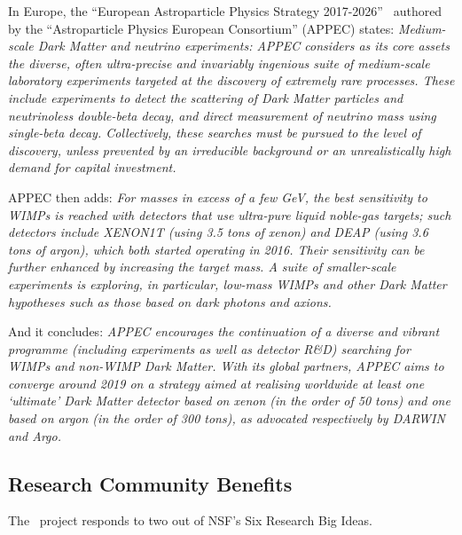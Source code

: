 In Europe, the ``European Astroparticle Physics Strategy 2017-2026''~\cite{AstroparticlePhysicsEuropeanConsortium:2017wy} authored by the ``Astroparticle Physics European Consortium'' (APPEC) states: {\it Medium-scale Dark Matter and neutrino experiments: APPEC considers as its core assets the diverse, often ultra-precise and invariably ingenious suite of medium-scale laboratory experiments targeted at the discovery of extremely rare processes.  These include experiments to detect the scattering of Dark Matter particles and neutrinoless double-beta decay, and direct measurement of neutrino mass using single-beta decay.  Collectively, these searches must be pursued to the level of discovery, unless prevented by an irreducible background or an unrealistically high demand for capital investment.}

APPEC then adds: {\it  For masses in excess of a few GeV, the best sensitivity to WIMPs is reached with detectors that use ultra-pure liquid noble-gas targets; such detectors include XENON1T (using 3.5 tons of xenon) and DEAP (using 3.6 tons of argon), which both started operating in 2016.  Their sensitivity can be further enhanced by increasing the target mass. A suite of smaller-scale experiments is exploring, in particular, low-mass WIMPs and other Dark Matter hypotheses such as those based on dark photons and axions.}

And it concludes: {\it APPEC encourages the continuation of a diverse and vibrant programme (including experiments as well as detector R\&D) searching for WIMPs and non-WIMP Dark Matter. With its global partners, APPEC aims to converge around 2019 on a strategy aimed at realising worldwide at least one `ultimate' Dark Matter detector based on xenon (in the order of 50 tons) and one based on argon (in the order of 300 tons), as advocated respectively by DARWIN and Argo.}


\subsection{Research Community Benefits}

The \DSks\ project responds to two out of  NSF's Six Research Big Ideas.

